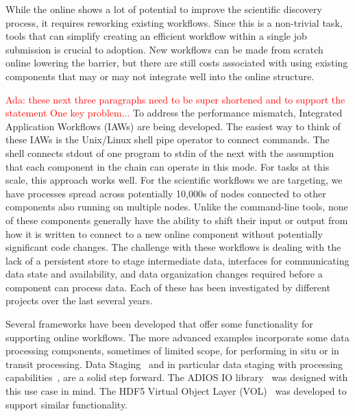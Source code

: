 \documentclass[conference]{IEEEtran}
\newcommand{\ada}[1]{\textcolor{red}{Ada: #1}}
\begin{document}
While the online shows a lot of potential to improve the scientific discovery
process, it requires reworking existing workflows. Since this is a non-trivial
task, tools that can simplify creating an efficient workflow within a single job
submission is crucial to adoption.
New workflows can
be made from scratch online lowering the barrier, but there are still costs
associated with using existing components that may or may not integrate well
into the online structure.



\ada{these next three paragraphs need to be super shortened and to
  support the statement One key problem... }
To address the performance mismatch, Integrated Application Workflows (IAWs)
are being developed. The easiest way to think of these IAWs is the Unix/Linux
shell pipe operator to connect commands. The shell connects stdout of one
program to stdin of the next with the assumption that each component in the
chain can operate in this mode. For tasks at this scale, this approach works
well. For the scientific workflows we are targeting, we have processes spread
across potentially 10,000s of nodes connected to other components also running
on multiple nodes. Unlike the command-line tools, none of these components
generally have the ability to shift their input or output from how it is
written to connect to a new online component without potentially significant
code changes. The challenge with these workflows is dealing with the lack of a
persistent store to stage intermediate data, interfaces for communicating data
state and availability, and data organization changes required before a
component can process data.  Each of these has been investigated by different
projects over the last several years.

Several frameworks have been developed that offer some functionality for
supporting online workflows. The more advanced examples incorporate some data
processing components, sometimes of limited scope, for performing in situ or in
transit processing. Data Staging~\cite{nisar:2008:staging} and in particular
data staging with processing
capabilities~\cite{abbasi:2009:datastager,ober:seismic}, are a solid step
forward. The ADIOS IO library~\cite{lofstead:2009:adaptable} was designed with
this use case in mind. The HDF5 Virtual Object Layer
(VOL)~\cite{chaarawi:2013:hdf5-vol} was developed to support similar
functionality.
\end{document}
